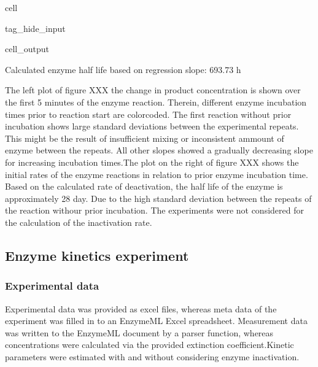 \documentclass[letterpaper,10pt,english]{jupyterBook}
\begin{document}
\begin{sphinxuseclass}{cell}
\begin{sphinxuseclass}{tag_hide_input}
\begin{sphinxVerbatimOutput}
\begin{sphinxuseclass}{cell_output}
\noindent{}

\begin{sphinxVerbatim}[commandchars=\\\{\}]
Calculated enzyme half life based on regression slope: 693.73 h
\end{sphinxVerbatim}

\end{sphinxuseclass}\end{sphinxVerbatimOutput}

\end{sphinxuseclass}
\end{sphinxuseclass}
\sphinxAtStartPar
{}

\sphinxAtStartPar
The left plot of figure XXX the change in product concentration is shown over the first 5 minutes of the enzyme reaction. Therein, different enzyme incubation times prior to reaction start are color\sphinxhyphen{}coded. The first reaction without prior incubation shows large standard deviations between the experimental repeats. This might be the result of insufficient mixing or inconsistent ammount of enzyme between the repeats. All other slopes showed a gradually decreasing slope for increasing incubation times.The plot on the right of figure XXX shows the initial rates of the enzyme reactions in relation to prior enzyme incubation time. Based on the calculated rate of deactivation, the half life of the enzyme is approximately 28 day. Due to the high standard deviation between the repeats of the reaction withour prior incubation. The experiments were not considered for the calculation of the inactivation rate.


\subsection{Enzyme kinetics experiment}
\label{\detokenize{scenarios/enzyme_inactivation:enzyme-kinetics-experiment}}

\subsubsection{Experimental data}
\label{\detokenize{scenarios/enzyme_inactivation:experimental-data}}
\sphinxAtStartPar
Experimental data was provided as excel files, whereas meta data of the experiment was filled in to an EnzymeML Excel spreadsheet. Measurement data was written to the EnzymeML document by a parser function, whereas concentrations were calculated via the provided extinction coefficient.Kinetic parameters were estimated with and without considering enzyme inactivation.
\end{document}
